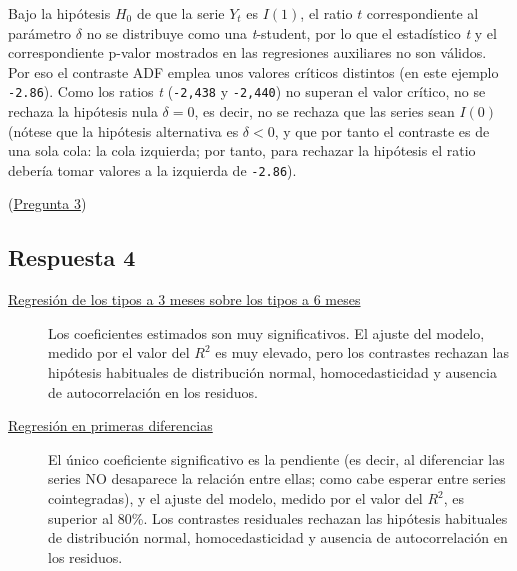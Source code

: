 \documentclass[10pt]{article}
\begin{document}
Bajo la hipótesis \(H_0\) de que la serie \(Y_t\) es \(I(1)\), el ratio \(t\)
correspondiente al parámetro \(\delta\) no se distribuye como una
\emph{t}-student, por lo que el estadístico \emph{t} y el correspondiente
p-valor mostrados en las regresiones auxiliares no son válidos. Por
eso el contraste ADF emplea unos valores críticos distintos (en este
ejemplo \texttt{-2.86}). Como los ratios \emph{t} (\texttt{-2,438} y \texttt{-2,440}) no superan
el valor crítico, no se rechaza la hipótesis nula \(\delta=0\), es
decir, no se rechaza que las series sean \(I(0)\) (nótese que la
hipótesis alternativa es \(\delta<0\), y que por tanto el contraste es
de una sola cola: la cola izquierda; por tanto, para rechazar la
hipótesis el ratio debería tomar valores a la izquierda de \texttt{-2.86}).

(\hyperref[sec:org5960aaa]{Pregunta 3})
\subsection*{Respuesta 4}
\label{sec:org0e7c6d9}

\begin{description}
\item[{\hyperref[sec:org6fc9b76]{Regresión de los tipos a 3 meses sobre los tipos a 6 meses}}] Los
coeficientes estimados son muy significativos. El ajuste del modelo,
medido por el valor del \(R^2\) es muy elevado, pero los contrastes
rechazan las hipótesis habituales de distribución normal,
homocedasticidad y ausencia de autocorrelación en los residuos.

\item[{\hyperref[sec:org752efb0]{Regresión en primeras diferencias}}] El único coeficiente
significativo es la pendiente (es decir, al diferenciar las series
NO desaparece la relación entre ellas; como cabe esperar entre
series cointegradas), y el ajuste del modelo, medido por el valor
del \(R^2\), es superior al 80\%. Los contrastes residuales rechazan
las hipótesis habituales de distribución normal, homocedasticidad y
ausencia de autocorrelación en los residuos.
\end{description}
\end{document}
